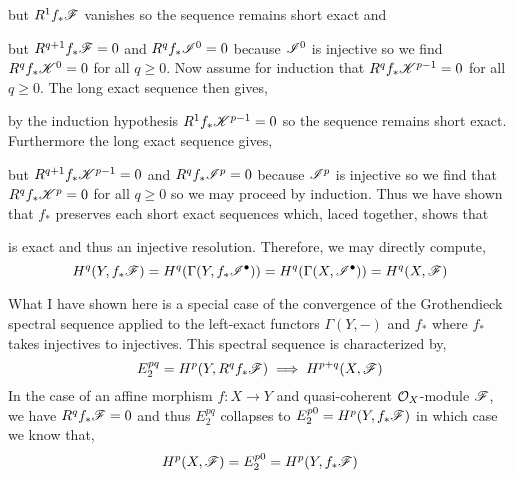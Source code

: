 \documentclass[12pt]{article}
\begin{document}
but $R^1 f_* \mathscr{F}$ vanishes so the sequence remains short exact and 
\begin{center}
\end{center}
but $R^{q+1} f_* \mathscr{F} = 0$ and $R^q f_* \mathscr{I}^0 = 0$ because $\mathscr{I}^0$ is injective so we find $R^q f_* \mathscr{K}^0 = 0$ for all $q \ge 0$. Now assume for induction that $R^q f_* \mathscr{K}^{p - 1} = 0$ for all $q \ge 0$. The long exact sequence then gives,
\begin{center}
\end{center}
by the induction hypothesis $R^1 f_* \mathscr{K}^{p - 1} = 0$ so the sequence remains short exact. Furthermore the long exact sequence gives,
\begin{center}
\end{center}
but $R^{q+1} f_* \mathscr{K}^{p-1} = 0$ and $R^q f_* \mathscr{I}^p = 0$ because $\mathscr{I}^p$ is injective so we find that $R^q f_* \mathscr{K}^p = 0$ for all $q \ge 0$ so we may proceed by induction. Thus we have shown that $f_*$ preserves each short exact sequences which, laced together, shows that
\begin{center}
\end{center}
is exact and thus an injective resolution. Therefore, we may directly compute,
\[ H^q(Y, f_* \mathscr{F}) = H^q(\Gamma(Y, f_* \mathscr{I}^\bullet)) = H^q(\Gamma(X, \mathscr{I}^\bullet)) = H^q(X, \mathscr{F}) \]

\begin{remark}
What I have shown here is a special case of the convergence of the Grothendieck spectral sequence applied to the left-exact functors $\Gamma(Y, -)$ and $f_*$ where $f_*$ takes injectives to injectives. This spectral sequence is characterized by,
\[ E^{pq}_2 = H^p(Y, R^q f_* \mathscr{F}) \implies H^{p+q}(X, \mathscr{F}) \] 
In the case of an affine morphism $f : X \to Y$ and quasi-coherent $\mathcal{O}_{X}$-module $\mathscr{F}$, we have $R^q f_* \mathscr{F} = 0$ and thus $E^{pq}_2$ collapses to $E_2^{p0} = H^p(Y, f_* \mathscr{F})$ in which case we know that,
\[ H^p(X, \mathscr{F}) = E^{p0}_2 = H^p(Y, f_* \mathscr{F}) \]
\end{remark}
\end{document}
